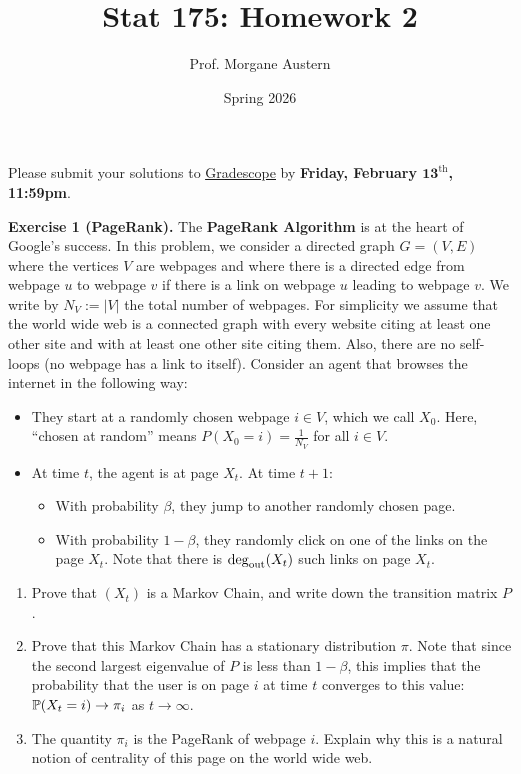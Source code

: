 \documentclass{article}
\title{\textbf{\textsf{Stat 175: Homework 2}}}
\author{\textsf{Prof. Morgane Austern}}
\date{\textsf{Spring 2026}}
\begin{document}
\maketitle

Please submit your solutions to \href{https://www.gradescope.com/courses/1244242}{\underline{Gradescope}} by \textbf{Friday, February $\bm{13}^{\text{th}}$, 11:59pm}.\newpar

\begin{tcolorbox}[colback = gray!16, enhanced, boxrule=0pt, frame hidden, sharp corners, borderline west={3pt}{-1.5pt}{black!80},breakable]
\textbf{Exercise 1 (PageRank).} The \textbf{PageRank Algorithm} is at the heart of \textsf{{\color{gb}G}{\color{gr}o}{\color{gy}o}{\color{gb}g}{\color{gg}l}{\color{gr}e}}'s success. In this problem, we consider a directed graph $G=(V,E)$ where the vertices $V$ are webpages and where there is a directed edge from webpage $u$ to webpage $v$ if there is a link on webpage $u$ leading to webpage $v$. We write by $N_V := |V|$ the total number of webpages. For simplicity we assume that the world wide web is a connected graph with every website citing at least one other site and with at least one other site citing them. Also, there are no self-loops (no webpage has a link to itself). Consider an agent that browses the internet in the following way: \begin{itemize}
    \item They start at a randomly chosen webpage $i\in V$, which we call $X_0$. Here, ``chosen at random'' means $P(X_0=i)=\frac{1}{N_V}$ for all $i\in V$.
    \item At time $t$, the agent is at page  $X_t$. At time $t+1$:\begin{itemize} \item With probability $\beta$, they jump to another randomly chosen page. \item With probability $1-\beta$, they randomly click on one of the links on the page $X_t$. Note that there is $\deg_{\rm{out}}(X_t)$ such links on page $X_t$.\end{itemize}
\end{itemize}


\begin{enumerate}[$(a)$]
    \item Prove that $(X_t)$ is a Markov Chain, and write down the transition matrix $P$.
    \item Prove that this Markov Chain has a stationary distribution $\pi$. Note that since the second largest eigenvalue of $P$ is less than $1-\beta$, this implies that the probability that the user is on page $i$ at time $t$ converges to this value: $\P(X_t=i)\rightarrow\pi_i$ as $t\rightarrow\infty$.
    \item The quantity $\pi_i$ is the PageRank of webpage $i$. Explain why this is a natural notion of centrality of this page on the world wide web.
\end{enumerate}


\end{tcolorbox}
\end{document}
